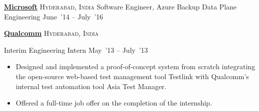 \documentclass[10pt,a4paper]{article}
\begin{document}
\headedsection  %
  {\href{}{\textbf{Microsoft}}}
  {\textsc{Hyderabad, India}}
  {%
  \headedsubsection
    {Software Engineer, Azure Backup Data Plane Engineering}
    {June~'14 -- July~'16}
    {}
}

\headedsection  %
  {\href{}{\textbf{Qualcomm}}}
  {\textsc{Hyderabad, India}}
  {%
  \headedsubsection
    {Interim Engineering Intern}
    {May~'13 -- July~'13}
    {\bodytext
    {
    \begin{itemize}
    \item Designed and implemented a proof-of-concept system from scratch integrating the open-source web-based test management tool Testlink with Qualcomm's internal test automation tool Asia Test Manager.
    \item Offered a full-time job offer on the completion of the internship.
    \end{itemize}}
    }
   
}

\spacedhrule{0.5em}{-0.4em}
\end{document}
